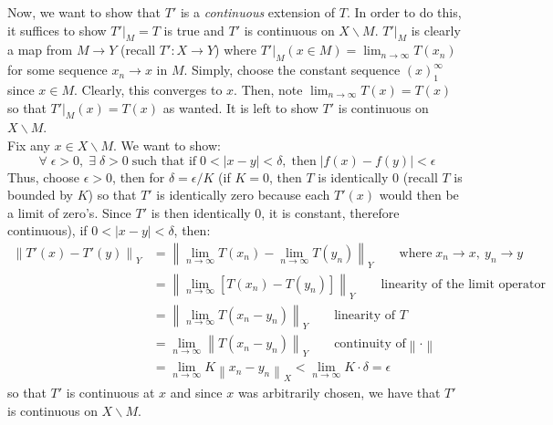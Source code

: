 \documentclass{article}
\newcommand{\norm}[1]{\left\lVert#1\right\rVert}
\begin{document}
    Now, we want to show that $T'$ is a \textit{continuous} extension of $T$. In order to do this, it suffices to show $T'|_M = T$
    is true and $T'$ is continuous on $X\backslash M$. 
    $T'|_M$ is clearly a map from $M\to Y$ (recall $T':X\to Y$) where $T'|_M(x\in M) = \lim_{n\to\infty} T(x_n)$ for
    some sequence $x_n\to x$ in $M$. Simply, choose the constant sequence $(x)_1^{\infty}$ since $x\in M$.  Clearly, this converges to
    $x$. Then, note $\lim_{n\to\infty} T(x) = T(x)$ so that $T'|_M(x) = T(x)$ as wanted. It is left to show $T'$ is continuous on
    $X\backslash M$.\\

    Fix any $x\in X\backslash M$. We want to show:
    \[ \forall\;\epsilon>0,\;\exists\;\delta>0\;\text{such that if}\; 0<|x-y|<\delta,\;\text{then}\;|f(x)-f(y)|<\epsilon \]
    Thus, choose $\epsilon > 0$, then for $\delta = \epsilon/K$ (if $K=0$, then $T$ is identically 0 (recall $T$ is bounded by $K$) 
    so that $T'$ is identically zero because each $T'(x)$ would then be a limit of zero's. Since $T'$ is then
    identically 0, it is constant, therefore continuous), if $0<|x-y|<\delta$, then:
    \begin{align*}
        \norm{T'(x) - T'(y)}_Y &= \norm{\lim_{n\to\infty} T(x_n) - \lim_{n\to\infty} T(y_n)}_Y\qquad\text{where}\;x_n\to x,\:y_n\to y\\
            &= \norm{\lim_{n\to\infty} [T(x_n)-T(y_n)]}_Y\qquad\text{linearity of the limit operator} \\
            &= \norm{\lim_{n\to\infty} T(x_n-y_n)}_Y\qquad\text{linearity of $T$} \\
            &= \lim_{n\to\infty} \norm{T(x_n-y_n)}_Y\qquad\text{continuity of} \norm{\cdot} \\
            &= \lim_{n\to\infty} K\norm{x_n-y_n}_X < \lim_{n\to\infty} K\cdot \delta = \epsilon
    \end{align*}
    so that $T'$ is continuous at $x$ and since $x$ was arbitrarily chosen, we have that $T'$ is continuous on $X\backslash M$. 
\end{document}
